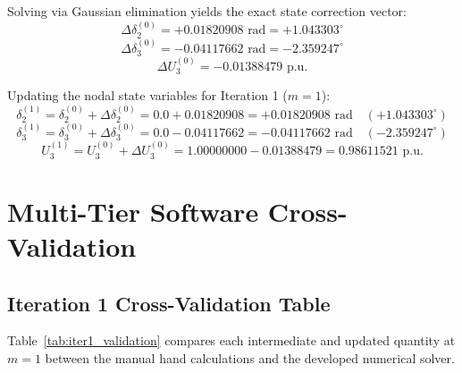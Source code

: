 \documentclass[12pt,a4paper,oneside]{report}
\begin{document}
Solving via Gaussian elimination yields the exact state correction vector:
\begin{equation}
\Delta \delta_2^{(0)} = +0.01820908\text{ rad} = +1.043303^\circ
\end{equation}
\begin{equation}
\Delta \delta_3^{(0)} = -0.04117662\text{ rad} = -2.359247^\circ
\end{equation}
\begin{equation}
\Delta U_3^{(0)} = -0.01388479\text{ p.u.}
\end{equation}

Updating the nodal state variables for Iteration 1 ($m = 1$):
\begin{equation}
\delta_2^{(1)} = \delta_2^{(0)} + \Delta \delta_2^{(0)} = 0.0 + 0.01820908 = +0.01820908\text{ rad} \quad (+1.043303^\circ)
\end{equation}
\begin{equation}
\delta_3^{(1)} = \delta_3^{(0)} + \Delta \delta_3^{(0)} = 0.0 - 0.04117662 = -0.04117662\text{ rad} \quad (-2.359247^\circ)
\end{equation}
\begin{equation}
U_3^{(1)} = U_3^{(0)} + \Delta U_3^{(0)} = 1.00000000 - 0.01388479 = 0.98611521\text{ p.u.}
\end{equation}

\section{Multi-Tier Software Cross-Validation}

\subsection{Iteration 1 Cross-Validation Table}
Table~\ref{tab:iter1_validation} compares each intermediate and updated quantity at $m = 1$ between the manual hand calculations and the developed numerical solver.
\end{document}
